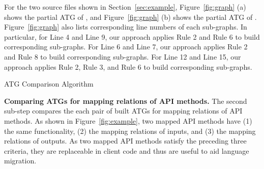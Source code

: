 For the two source files shown in Section~\ref{sec:example},
Figure~\ref{fig:graph} (a) shows the partial ATG of
, and Figure~\ref{fig:graph} (b) shows the
partial ATG of . Figure~\ref{fig:graph} also
lists corresponding line numbers of each sub-graphs. In particular,
for Line 4 and Line 9, our approach applies Rule 2 and Rule 6 to
build corresponding sub-graphs. For Line 6 and Line 7, our approach
applies Rule 2 and Rule 8 to build corresponding sub-graphs. For
Line 12 and Line 15, our approach applies Rule 2, Rule 3, and Rule 6
to build corresponding sub-graphs.
\begin{algorithm}[t]
\begin{SmallOut}
\label{alg:mapATG} \dontprintsemicolon
 \end{SmallOut}
\caption{ATG Comparison Algorithm}
\end{algorithm}

\textbf{Comparing ATGs for mapping relations of API methods.} The
second sub-step compares the each pair of built ATGs for mapping
relations of API methods. As shown in Figure~\ref{fig:example}, two
mapped API methods have (1) the same functionality, (2) the mapping
relations of inputs, and (3) the mapping relations of outputs. As
two mapped API methods satisfy the preceding three criteria, they
are replaceable in client code and thus are useful to aid language
migration.


